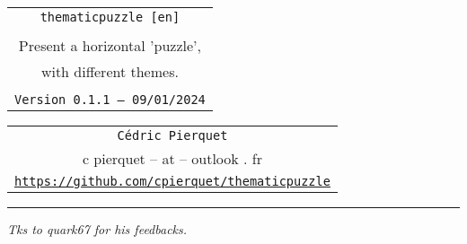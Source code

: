 \documentclass[11pt,a4paper]{ltxdoc}
\def\TPversion{0.1.1}
\def\TPdate{09/01/2024}
\begin{document}
\pagestyle{fancy}

\thispagestyle{empty}

\begin{center}
	\begin{minipage}{0.88\linewidth}
	\begin{tcolorbox}[colframe=yellow,colback=yellow!15]
		\begin{center}
			\begin{tabular}{c}
				{\Huge \texttt{thematicpuzzle [en]}}\\
				\\
				{\LARGE Present a horizontal 'puzzle',} \\
				{\LARGE with different themes.} \\
				\\
				{\small \texttt{Version \TPversion{} -- \TPdate}}
		\end{tabular}
		\end{center}
	\end{tcolorbox}
\end{minipage}
\end{center}

\begin{center}
	\begin{tabular}{c}
	\texttt{Cédric Pierquet}\\
	{\ttfamily c pierquet -- at -- outlook . fr}\\
	\texttt{\url{https://github.com/cpierquet/thematicpuzzle}} \\
\end{tabular}
\end{center}

\hrule

\vfill

\begin{tcolorbox}[colframe=lightgray,colback=lightgray!5,halign=center]
\end{tcolorbox}

\begin{tcolorbox}[colframe=lightgray,colback=lightgray!5,halign=center]
\ThematicPuzzle[Thickness=1.25pt,Scale=2.75,BgColors={yellow!10,orange!10,green!10,teal!10,purple!10},Labels={Angry,Python,Cool,Apple,Battery},BorderColor=darkgray,IconsColor=teal!50!black]{\faAngry,\faPython,\faAngellist,\faApple*,\faBatteryHalf}
\end{tcolorbox}

\vfill

\hfill{\footnotesize\itshape Tks to quark67 for his feedbacks.}
\end{document}
